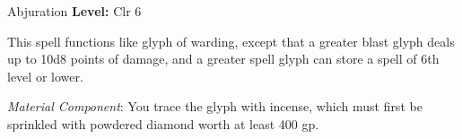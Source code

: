 {Abjuration}
{
	\textbf{Level:}
	Clr 6\\
}
{
	This spell functions like glyph of warding, except that a greater blast glyph deals up to 10d8 points of damage, and a greater spell glyph can store a spell of 6th level or lower.

	\textit{Material Component}:
	You trace the glyph with incense, which must first be sprinkled with powdered diamond worth at least 400 gp.

}
